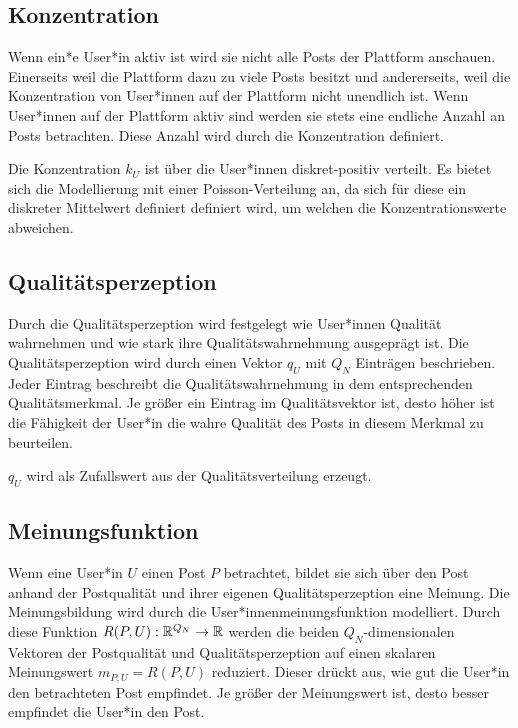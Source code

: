 \subsection{Konzentration}

Wenn ein*e User*in aktiv ist wird sie nicht alle Posts der Plattform anschauen. Einerseits weil die Plattform dazu zu viele Posts besitzt und andererseits, weil die Konzentration von User*innen auf der Plattform nicht unendlich ist. Wenn User*innen auf der Plattform aktiv sind werden sie stets eine endliche Anzahl an Posts betrachten. Diese Anzahl wird durch die Konzentration definiert.

Die Konzentration $k_U$ ist über die User*innen diskret-positiv verteilt. Es bietet sich die Modellierung mit einer Poisson-Verteilung an, da sich für diese ein diskreter Mittelwert definiert definiert wird, um welchen die Konzentrationswerte abweichen.

\subsection{Qualitätsperzeption}
\label{uqualitaet}

Durch die Qualitätsperzeption wird festgelegt wie User*innen Qualität wahrnehmen und wie stark ihre Qualitätswahrnehmung ausgeprägt ist. Die Qualitätsperzeption wird durch einen Vektor $q_U$ mit $Q_N$  Einträgen beschrieben. Jeder Eintrag beschreibt die Qualitätswahrnehmung in dem entsprechenden Qualitätsmerkmal. Je größer ein Eintrag im Qualitätsvektor ist, desto höher ist die Fähigkeit der User*in die wahre Qualität des Posts in diesem Merkmal zu beurteilen.

$q_U$ wird als Zufallswert aus der Qualitätsverteilung erzeugt.

\subsection{Meinungsfunktion}

Wenn eine User*in $U$ einen Post $P$ betrachtet, bildet sie sich über den Post anhand der Postqualität und ihrer eigenen Qualitätsperzeption eine Meinung. Die Meinungsbildung wird durch die User*innenmeinungsfunktion modelliert. Durch diese Funktion $R(P,U): \mathbb{R}^{Q_N} \rightarrow \mathbb{R} $ werden die beiden $Q_N$-dimensionalen Vektoren der Postqualität und Qualitätsperzeption auf einen skalaren Meinungswert $m_{P,U} = R(P,U)$ reduziert. Dieser drückt aus, wie gut die User*in den betrachteten Post empfindet. Je größer der Meinungswert ist, desto besser empfindet die User*in den Post.


